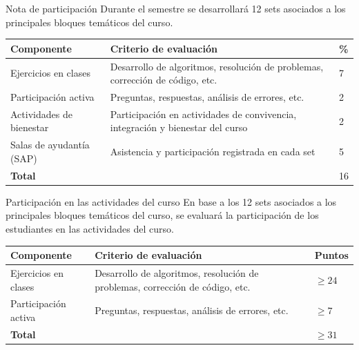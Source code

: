 \documentclass{beamer}
\begin{document}
    \begin{frame}{Nota de participación}
        Durante el semestre se desarrollará 12 sets asociados a los principales
        bloques temáticos del curso.
        
        \begin{tabular}{|p{2.5cm}|p{6.1cm}|p{0.4cm}|}
            \hline
            \textbf{Componente} & \textbf{Criterio de evaluación} & \textbf{\%} \\ \hline
            Ejercicios en clases & Desarrollo de algoritmos, resolución de problemas,
            corrección de código, etc. & 7 \\ \hline
            Participación activa & Preguntas, respuestas, análisis de errores,
             etc. & 2 \\ \hline
            Actividades de bienestar & Participación en actividades de convivencia, 
            integración y bienestar del curso & 2 \\ \hline
            Salas de ayudantía (SAP) & Asistencia y participación registrada en cada
            set & 5 \\ \hline
            \textbf{Total} & & 16 \\ \hline
        \end{tabular}
    \end{frame}

    \begin{frame}{Participación en las actividades del curso}
        En base a los 12 sets asociados a los principales bloques temáticos del curso, se evaluará la participación 
        de los estudiantes en las actividades del curso.
        
        \begin{tabular}{|p{2cm}|p{6cm}|p{1cm}|}
            \hline
            \textbf{Componente} & \textbf{Criterio de evaluación} & \textbf{Puntos} \\ \hline
            Ejercicios en clases & Desarrollo de algoritmos, resolución de problemas,
            corrección de código, etc. & $\geq 24$ \\ \hline
            Participación activa & Preguntas, respuestas, análisis de errores,
             etc. & $\geq 7$ \\ \hline
            \textbf{Total} & & $\geq 31$ \\ \hline
        \end{tabular}
    \end{frame}
\end{document}
